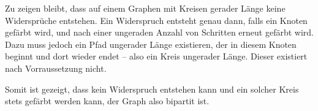 \documentclass[a4paper]{article}
\begin{document}
Zu zeigen bleibt, dass auf einem Graphen mit Kreisen gerader Länge keine
Widersprüche entstehen. Ein Widerspruch entsteht genau dann, falls ein
Knoten gefärbt wird, und nach einer ungeraden Anzahl von Schritten erneut
gefärbt wird. Dazu muss jedoch ein Pfad ungerader Länge existieren, der in
diesem Knoten beginnt und dort wieder endet -- also ein Kreis ungerader
Länge. Dieser existiert nach Vorraussetzung nicht.

Somit ist gezeigt, dass kein Widerspruch entstehen kann und ein solcher Kreis
stets gefärbt werden kann, der Graph also bipartit ist.
\end{document}
